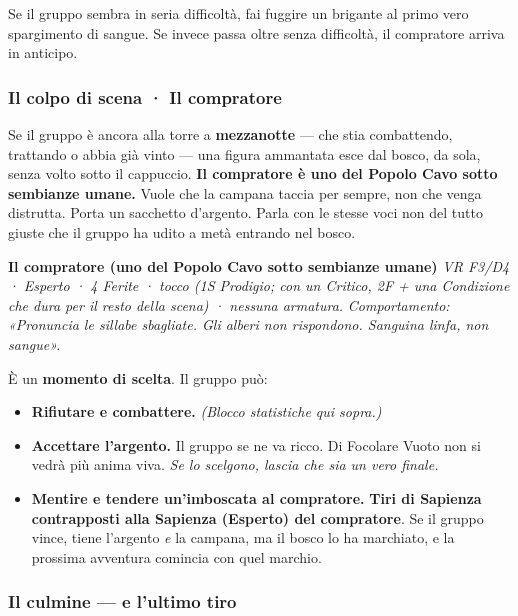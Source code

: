 \documentclass[10pt,a4paper]{article}
\newcommand{\tightlist}{\setlength{\itemsep}{0pt}\setlength{\parskip}{0pt}}
\begin{document}
Se il gruppo sembra in seria difficoltà, fai fuggire un brigante al primo vero spargimento di sangue. Se invece passa oltre senza difficoltà, il compratore arriva in anticipo.

\subsubsection{Il colpo di scena · Il compratore}\label{il-colpo-di-scena-il-compratore}

Se il gruppo è ancora alla torre a \textbf{mezzanotte} --- che stia combattendo, trattando o abbia già vinto --- una figura ammantata esce dal bosco, da sola, senza volto sotto il cappuccio. \textbf{Il compratore è uno del Popolo Cavo sotto sembianze umane.} Vuole che la campana taccia per sempre, non che venga distrutta. Porta un sacchetto d'argento. Parla con le stesse voci non del tutto giuste che il gruppo ha udito a metà entrando nel bosco.

\par\smallskip\begin{rpgnote}[fontupper=\normalfont]\textbf{Il compratore (uno del Popolo Cavo sotto sembianze umane)} \emph{VR F3/D4 · Esperto · 4 Ferite · tocco (1S Prodigio; con un Critico, 2F + una Condizione che dura per il resto della scena) · nessuna armatura.} \emph{Comportamento: «Pronuncia le sillabe sbagliate. Gli alberi non rispondono. Sanguina linfa, non sangue».}\end{rpgnote}\par\smallskip
È un \textbf{momento di scelta}. Il gruppo può:

\begin{itemize}
\tightlist
\item
  \textbf{Rifiutare e combattere.} \emph{(Blocco statistiche qui sopra.)}
\item
  \textbf{Accettare l'argento.} Il gruppo se ne va ricco. Di Focolare Vuoto non si vedrà più anima viva. \emph{Se lo scelgono, lascia che sia un vero finale.}
\item
  \textbf{Mentire e tendere un'imboscata al compratore.} \textbf{Tiri di Sapienza contrapposti alla Sapienza (Esperto) del compratore}. Se il gruppo vince, tiene l'argento \emph{e} la campana, ma il bosco lo ha marchiato, e la prossima avventura comincia con quel marchio.
\end{itemize}

\subsubsection{Il culmine --- e l'ultimo tiro}\label{il-culmine-lultimo-tiro}
\end{document}

